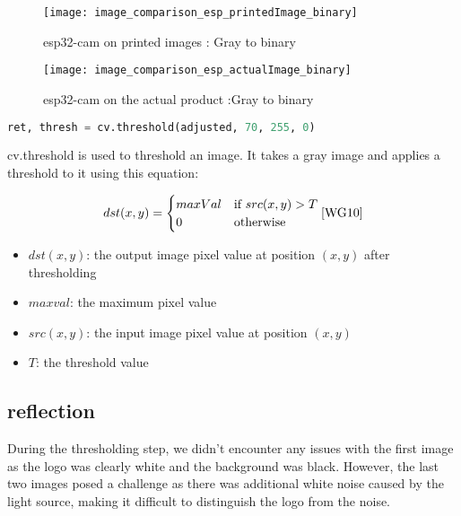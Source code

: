 \FloatBarrier
\FloatBarrier
\begin{figure}[h]
\FloatBarrier
         \centering
        \texttt{[image: image\_comparison\_esp\_printedImage\_binary]}
   
        \caption{esp32-cam on printed images : Gray to binary}
        \label{fig:Phone's images : Gray to binary}
\FloatBarrier
    \end{figure}


\FloatBarrier
\FloatBarrier
\begin{figure}[h]
\FloatBarrier
         \centering
        \texttt{[image: image\_comparison\_esp\_actualImage\_binary]}
   
        \caption{esp32-cam on the actual product :Gray to binary}
        \label{fig:Phone's images :  Gray to binary}
\FloatBarrier
    \end{figure}


\FloatBarrier 
\begin{lstlisting}[language=Python]
 ret, thresh = cv.threshold(adjusted, 70, 255, 0)
\end{lstlisting}
 cv.threshold is used to threshold an image. It takes a gray image and applies a threshold to it \cite{WG10} using this equation:

\begin{equation}
dst(x,y) = \begin{cases}
maxVal &\text{if } src(x,y) > T \\
0 &\text{otherwise}
\end{cases}
\cite{WG10}
\end{equation}
\begin{itemize}
\item $dst(x,y)$: the output image pixel value at position $(x,y)$ after thresholding
\item $maxval$: the maximum pixel value 
\item $src(x,y)$: the input image pixel value at position $(x,y)$
\item $T$: the threshold value 
\end{itemize}
\subsection{reflection}
During the thresholding step, we didn't encounter any issues with the first image as the logo was clearly white and the background was black. However, the last two images posed a challenge as there was additional white noise caused by the light source, making it difficult to distinguish the logo from the noise.
